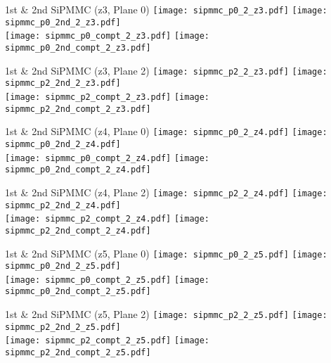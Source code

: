 \documentclass{beamer}
\begin{document}
\begin{frame}{1st \& 2nd SiPMMC (z3, Plane 0)}
	\texttt{[image: sipmmc\_p0\_2\_z3.pdf]}
	\texttt{[image: sipmmc\_p0\_2nd\_2\_z3.pdf]} \\
	
		\texttt{[image: sipmmc\_p0\_compt\_2\_z3.pdf]}
		\texttt{[image: sipmmc\_p0\_2nd\_compt\_2\_z3.pdf]}
\end{frame}

\begin{frame}{1st \& 2nd SiPMMC (z3, Plane 2)}
	\texttt{[image: sipmmc\_p2\_2\_z3.pdf]}
	\texttt{[image: sipmmc\_p2\_2nd\_2\_z3.pdf]} \\
	
		\texttt{[image: sipmmc\_p2\_compt\_2\_z3.pdf]}
		\texttt{[image: sipmmc\_p2\_2nd\_compt\_2\_z3.pdf]}
\end{frame}

\begin{frame}{1st \& 2nd SiPMMC (z4, Plane 0)}
	\texttt{[image: sipmmc\_p0\_2\_z4.pdf]}
	\texttt{[image: sipmmc\_p0\_2nd\_2\_z4.pdf]} \\
	
		\texttt{[image: sipmmc\_p0\_compt\_2\_z4.pdf]}
		\texttt{[image: sipmmc\_p0\_2nd\_compt\_2\_z4.pdf]}
\end{frame}

\begin{frame}{1st \& 2nd SiPMMC (z4, Plane 2)}
	\texttt{[image: sipmmc\_p2\_2\_z4.pdf]}
	\texttt{[image: sipmmc\_p2\_2nd\_2\_z4.pdf]} \\
	
		\texttt{[image: sipmmc\_p2\_compt\_2\_z4.pdf]}
		\texttt{[image: sipmmc\_p2\_2nd\_compt\_2\_z4.pdf]}
\end{frame}

\begin{frame}{1st \& 2nd SiPMMC (z5, Plane 0)}
	\texttt{[image: sipmmc\_p0\_2\_z5.pdf]}
	\texttt{[image: sipmmc\_p0\_2nd\_2\_z5.pdf]} \\
	
		\texttt{[image: sipmmc\_p0\_compt\_2\_z5.pdf]}
		\texttt{[image: sipmmc\_p0\_2nd\_compt\_2\_z5.pdf]}
\end{frame}

\begin{frame}{1st \& 2nd SiPMMC (z5, Plane 2)}
	\texttt{[image: sipmmc\_p2\_2\_z5.pdf]}
	\texttt{[image: sipmmc\_p2\_2nd\_2\_z5.pdf]} \\
	
		\texttt{[image: sipmmc\_p2\_compt\_2\_z5.pdf]}
		\texttt{[image: sipmmc\_p2\_2nd\_compt\_2\_z5.pdf]}
\end{frame}
\end{document}
